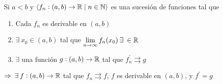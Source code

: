 \begin{theorem}
    Si $a < b $ y $\langle f_n : (a,b) \to \mathbb{R} \mid n \in \mathbb{N} \rangle$ es una sucesión de funciones tal que
    \begin{enumerate}
        \item Cada $f_n$ es derivable en $(a,b)$
        \item $\exists \: x_0 \in (a,b)$ tal que $\lim\limits_{n \to \infty} f_n(x_0) \: \exists \: \in \R$
        \item $\exists$ una función $g : (a,b) \to \mathbb{R}$ tal que ${f}^{\prime}_{n} \rightrightarrows g$
    \end{enumerate}

    $\Rightarrow \: \exists \: f: (a,b) \to \mathbb{R}$ tal que $f_n \rightrightarrows f$, $f$ es derivable en $(a,b)$, y ${f}^{\prime} = g$
\end{theorem}


